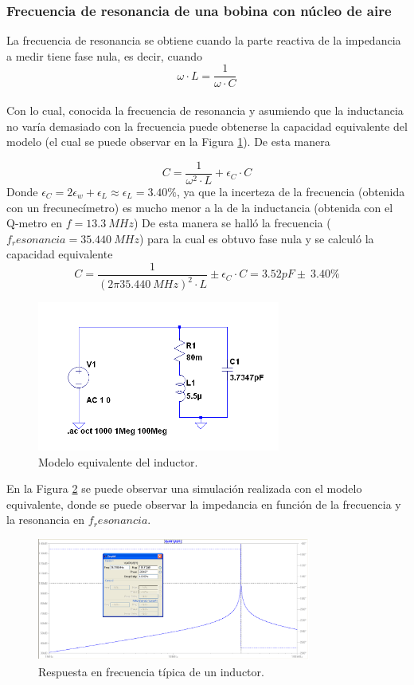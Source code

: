 \documentclass[a4paper,10pt]{article}
\begin{document}
		\subsubsection{Frecuencia de resonancia de una bobina con n\'ucleo de aire}
		La frecuencia de resonancia se obtiene cuando la parte reactiva de la impedancia a medir tiene fase nula, es decir, cuando
		$$\omega\cdot L=\frac{1}{\omega \cdot C}$$
		\\Con lo cual, conocida la frecuencia de resonancia y asumiendo que la inductancia no var\'ia demasiado con la frecuencia puede obtenerse la capacidad equivalente del modelo (el cual se puede observar en la Figura \ref{inductorequiv}). De esta manera
		
		$$C=\frac{1}{\omega^2 \cdot L}+\epsilon_C \cdot C$$
		Donde $\epsilon_C=2\epsilon_w+\epsilon_L\approx \epsilon_L =3.40\%$, ya que la incerteza de la frecuencia (obtenida con un frecunec\'imetro) es mucho menor a la de la inductancia (obtenida con el Q-metro en $f=13.3~MHz$)
		De esta manera se hall\'o la frecuencia ($f_resonancia=35.440~MHz$) para la cual es obtuvo fase nula y se calcul\'o la capacidad equivalente
		$$C=\frac{1}{(2\pi 35.440~MHz)^2 \cdot L}\pm \epsilon_C \cdot C=3.52pF \pm~3.40\%$$
			\begin{figure}[!htb]
				\centering
				\includegraphics[width=8cm]
				{Imagenes/induceqquiv.png}
				\caption{Modelo equivalente del inductor.}
				\label{inductorequiv} 
			\end{figure}
			En la Figura \ref{respfreq} se puede observar una simulaci\'on realizada con el modelo equivalente, donde se puede observar la impedancia en funci\'on de la frecuencia y la resonancia en $f_resonancia$.
			\begin{figure}[!htb]
				\centering
				\includegraphics[width=9cm]
				{Imagenes/respfreq.png}
				\caption{Respuesta en frecuencia t\'ipica de un inductor.}
				\label{respfreq} 
			\end{figure}
\end{document}
